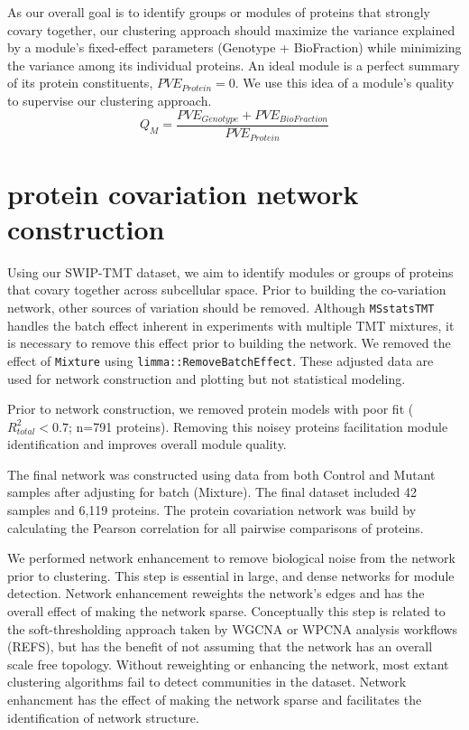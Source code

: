 \documentclass[11pt]{elife}\usepackage[]{graphicx}\usepackage[]{color}
\begin{document}
As our overall goal is to identify groups or modules of proteins that strongly
covary together, our clustering approach should maximize the variance explained
by a module's fixed-effect parameters (Genotype + BioFraction) while minimizing 
the variance among its individual proteins. 
An ideal module is a perfect summary of its protein constituents, 
$PVE_{Protein}=0$. We use this idea of a module's quality to supervise our 
clustering approach.
\begin{equation}
	Q_{M}=\frac{PVE_{Genotype} + PVE_{BioFraction}}{PVE_{Protein}}
\end{equation}


\section{protein covariation network construction}

Using our SWIP-TMT dataset, we aim to identify modules or groups of
proteins that covary together across subcellular space. Prior to building the
co-variation network, other sources of variation should be removed. Although
\texttt{MSstatsTMT} handles the batch effect inherent in experiments with
multiple TMT mixtures, it is necessary to remove this effect prior to building
the network. We removed the effect of \texttt{Mixture} using
\texttt{limma::RemoveBatchEffect}. These adjusted data are used for network
construction and plotting but not statistical modeling.

Prior to network construction, we removed protein models with poor fit 
($R^2_{total}<0.7$; n=791 proteins). Removing this noisey proteins facilitation
module identification and improves overall module quality.

The final network was constructed using data from both Control and Mutant 
samples after adjusting for batch (Mixture). The final dataset included 
42 samples and 6,119 proteins. The protein covariation network was build by
calculating the Pearson correlation for all pairwise comparisons of proteins.

We performed network enhancement to remove biological noise from the network
prior to clustering. This step is essential in large, and dense networks for
module detection. Network enhancement reweights the
network's edges and has the overall effect of making the network sparse.
Conceptually this step is related to the soft-thresholding approach taken by
WGCNA or WPCNA analysis workflows (REFS), but has the benefit of not assuming
that the network has an overall scale free topology.  Without reweighting or
enhancing the network, most extant clustering algorithms fail to detect
communities in the dataset.  Network enhancment has the effect of making the
network sparse and facilitates the identification of network structure.\\
\end{document}
